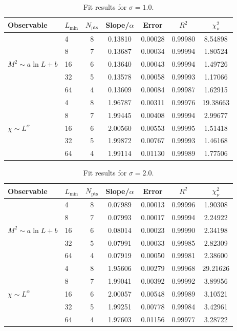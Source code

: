 \documentclass[11pt,a4paper]{article}
\begin{document}
\begin{table}[htbp]
\centering
\caption{Fit results for $\sigma=1.0$.}
\label{tab:fit10}
\small
\begin{tabular}{@{}llcS[table-format=1.5]S[table-format=1.5]S[table-format=1.5]S[table-format=2.5]@{}}
\toprule
Observable & $L_{\min}$ & $N_{\mathrm{pts}}$ & {Slope/$\alpha$} & {Error} & {$R^2$} & {$\chi^2_\nu$} \\
\midrule
{}
 & 4  & 8 & 0.13810 & 0.00028 & 0.99980 &  8.54898 \\
 & 8  & 7 & 0.13687 & 0.00034 & 0.99994 &  1.80524 \\
 & 16 & 6 & 0.13640 & 0.00043 & 0.99994 &  1.49726 \\
 & 32 & 5 & 0.13578 & 0.00058 & 0.99993 &  1.17066 \\
 & 64 & 4 & 0.13609 & 0.00084 & 0.99987 &  1.62915 \\
\midrule
{}
 & 4  & 8 & 1.96787 & 0.00311 & 0.99976 & 19.38663 \\
 & 8  & 7 & 1.99445 & 0.00408 & 0.99994 &  2.99677 \\
 & 16 & 6 & 2.00560 & 0.00553 & 0.99995 &  1.51418 \\
 & 32 & 5 & 1.99872 & 0.00767 & 0.99993 &  1.46168 \\
 & 64 & 4 & 1.99114 & 0.01130 & 0.99989 &  1.77506 \\
\bottomrule
\end{tabular}
\end{table}

\begin{table}[htbp]
\centering
\caption{Fit results for $\sigma=2.0$.}
\label{tab:fit20}
\small
\begin{tabular}{@{}llcS[table-format=1.5]S[table-format=1.5]S[table-format=1.5]S[table-format=2.5]@{}}
\toprule
Observable & $L_{\min}$ & $N_{\mathrm{pts}}$ & {Slope/$\alpha$} & {Error} & {$R^2$} & {$\chi^2_\nu$} \\
\midrule
{}
 & 4  & 8 & 0.07989 & 0.00013 & 0.99996 &  1.90308 \\
 & 8  & 7 & 0.07993 & 0.00017 & 0.99994 &  2.24922 \\
 & 16 & 6 & 0.08014 & 0.00023 & 0.99990 &  2.34198 \\
 & 32 & 5 & 0.07991 & 0.00033 & 0.99985 &  2.82309 \\
 & 64 & 4 & 0.07919 & 0.00050 & 0.99981 &  2.38600 \\
\midrule
{}
 & 4  & 8 & 1.95606 & 0.00279 & 0.99968 & 29.21626 \\
 & 8  & 7 & 1.99041 & 0.00392 & 0.99992 &  3.89956 \\
 & 16 & 6 & 2.00057 & 0.00548 & 0.99989 &  3.10521 \\
 & 32 & 5 & 1.99251 & 0.00778 & 0.99984 &  3.42961 \\
 & 64 & 4 & 1.97603 & 0.01156 & 0.99977 &  3.28722 \\
\bottomrule
\end{tabular}
\end{table}
\end{document}
